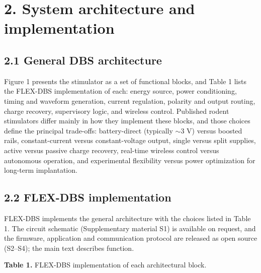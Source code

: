 \section{2. System architecture and implementation}\label{system-architecture-and-implementation}

\subsection{2.1 General DBS architecture}\label{general-dbs-architecture}

Figure 1 presents the stimulator as a set of functional blocks, and Table 1 lists the FLEX-DBS implementation of each: energy source, power conditioning, timing and waveform generation, current regulation, polarity and output routing, charge recovery, supervisory logic, and wireless control. Published rodent stimulators differ mainly in how they implement these blocks, and those choices define the principal trade-offs: battery-direct (typically $\sim$3 V) versus boosted rails, constant-current versus constant-voltage output, single versus split supplies, active versus passive charge recovery, real-time wireless control versus autonomous operation, and experimental flexibility versus power optimization for long-term implantation.

\subsection{2.2 FLEX-DBS implementation}\label{flex-dbs-implementation}

FLEX-DBS implements the general architecture with the choices listed in Table 1. The circuit schematic (Supplementary material S1) is available on request, and the firmware, application and communication protocol are released as open source (S2--S4); the main text describes function.

\textbf{Table 1.} FLEX-DBS implementation of each architectural block.

